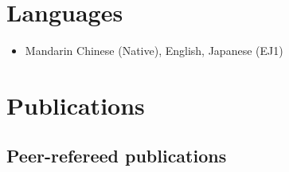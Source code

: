 \documentclass[letterpaper]{article}
\begin{document}




\section*{Languages}
\begin{itemize}
\item Mandarin Chinese (Native), English, Japanese (EJ1)
\end{itemize}


\section*{Publications}
\subsection*{Peer-refereed publications}
\end{document}
